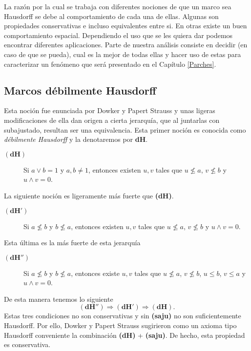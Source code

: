 \documentclass{comunicaciones}
\begin{document}
La razón por la cual se trabaja con diferentes nociones de que un marco sea Hausdorff se debe al comportamiento de cada una de ellas. Algunas son propiedades conservativas e incluso equivalentes entre si. En otras existe un buen comportamiento espacial. Dependiendo el uso que se les quiera dar podemos encontrar diferentes aplicaciones. Parte de nuestra análisis consiste en decidir (en caso de que se pueda), cual es la mejor de todas ellas y hacer uso de estas para caracterizar un fenómeno que será presentado en el Capítulo \ref{Parches}.

\subsection{Marcos débilmente Hausdorff}

Esta noción fue enunciada por Dowker y Papert Strauss y unas ligeras modificaciones de ella dan origen a cierta jerarquía, que al juntarlas con subajustado, resultan ser una equivalencia. Esta primer noción es conocida como \emph{débilmente Hausdorff} y la denotaremos por \textbf{dH}.\\

\begin{description}
    \item[$\mathbf{(dH)}$] Si $a\vee b=1$ y $a, b\neq 1$, entonces existen $u, v$ tales que $u\nleq a$, $v\nleq b$ y $u\wedge v=0$. 
\end{description}

La siguiente noción es ligeramente más fuerte que \textbf{(dH)}.

\begin{description}
    \item[$\mathbf{(dH')}$] Si $a\nleq b$ y $b\nleq a$, entonces existen $u, v$ tales que $u\nleq a$, $v\nleq b$ y $u\wedge v=0$. 
\end{description}

Esta última es la más fuerte de esta jerarquía

\begin{description}
    \item[$\mathbf{(dH'')}$] Si $a\nleq b$ y $b\nleq a$, entonces existe $u, v$ tales que $u\nleq a$, $v\nleq b$, $u\leq b$, $v\leq a$ y $u\wedge v=0$.  
\end{description}

De esta manera tenemos lo siguiente
\[
\mathbf{(dH'')}\Rightarrow \mathbf{(dH')}\Rightarrow \mathbf{(dH)}.
\]
Estas tres condiciones no son conservativas y sin \textbf{(saju)} no son suficientemente Hausdorff. Por ello, Dowker y Papert Strauss sugirieron como un axioma tipo Hausdorff conveniente la combinación \textbf{(dH)} + \textbf{(saju)}. De hecho, esta propiedad es conservativa. 
\end{document}

